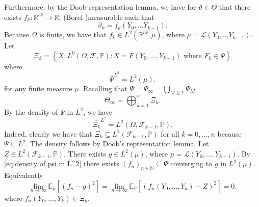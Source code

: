 \documentclass[11pt,a4paper,twoside,openany]{report}
\numberwithin{equation}{section}
\theoremstyle{plain} %
\theoremstyle{definition} %
\theoremstyle{remark} %
\begin{document}
    Furthermore, by the Doob-representation lemma, we have for \(\vartheta\in\Theta\) that there exists \(f_k:\mathbb{R}^{rk}\to\mathbb{R}\),  (Borel-)measurable such that
    \begin{equation*}
        \vartheta_k=f_k(Y_0,\dots Y_{k-1}).
    \end{equation*}
    Because \(\Omega\) is finite, we have that \(f_k\in L^2(\mathbb{R}^{rk},\mu)\), where \(\mu=\mathcal{L}(Y_0,\dots Y_{k-1})\).
    Let
    \begin{equation*}
        \Xi_k=\left\{X: L^0(\Omega,\mathcal{F},\mathbb{P}):X=F(Y_0,\dots,Y_{k-1})\text{ where } F_k\in\Psi\right\}
    \end{equation*}
    where 
    \begin{equation}\label{eq:density of psi in L^2}
        \overline{\Psi}^{L^2}=L^2(\mu).
    \end{equation}
    for any finite measure \(\mu\).
    Recalling that \(\Psi=\Psi_{\infty}=\bigcup_{M\geq 1}\Psi_M\)
    \begin{equation*}
        \Theta_{\infty}=\bigoplus_{k=1}^{n}\Xi_k.
    \end{equation*}
    By the density of \(\Psi\) in \(L^2\), we have 
    \begin{equation*}
    \overline{\Xi_k}^{L^2}=L^2(\Omega,\mathcal{F}_{k-1},\mathbb{P}).
    \end{equation*}
    Indeed, clearly we have that \(\Xi_k\subseteq L^2(\mathcal{F}_{k-1},\mathbb{P})\) for all \(k=0,\dots,n\) because \(\Psi\subseteq L^2\). The density follows by Doob's representation lemma. Let \(Z\in L^2(\mathcal{F}_{k-1},\mathbb{P})\). There exists \(g\in L^2(\mu)\), where \(\mu=\mathcal{L}(Y_0,\dots,Y_{k-1})\). By \eqref{eq:density of psi in L^2} there exists \((f_n)_{n\in\mathbb{N}}\subseteq\Psi\) converging to \(g\) in \(L^2(\mu)\). Equivalently
    \begin{equation*}
        \lim_{n\to\infty}\mathbb{E}_{\mu}[(f_n-g)^2]=\lim_{n\to\infty}\mathbb{E}_{\mathbb{P}}[(f_n(Y_0,\dots,Y_k)-Z)^2]=0.
    \end{equation*}
    where \(f_n(Y_0,\dots,Y_k)\in\Xi_k\).
\end{document}
